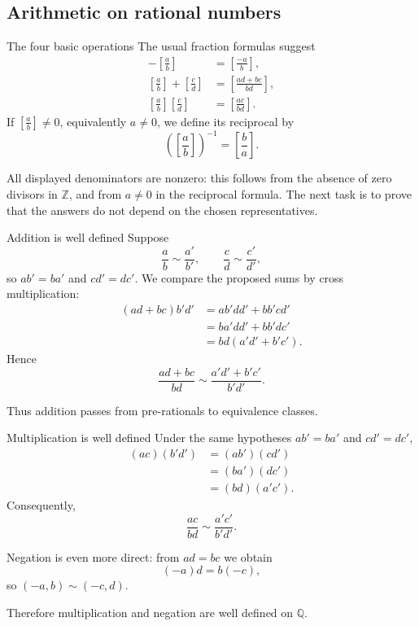 \documentclass[aspectratio=169,11pt]{beamer}
\newcommand{\Z}{\mathbb Z}
\newcommand{\Q}{\mathbb Q}
\newcommand{\qcl}[2]{\left[\frac{#1}{#2}\right]}
\begin{document}
\subsection{Arithmetic on rational numbers}

\begin{frame}{The four basic operations}
  The usual fraction formulas suggest
  \begin{align*}
    -\qcl ab&=\qcl{-a}b,\\
    \qcl ab+\qcl cd&=\qcl{ad+bc}{bd},\\
    \qcl ab\qcl cd&=\qcl{ac}{bd}.
  \end{align*}
  If \(\qcl ab\ne0\), equivalently \(a\ne0\), we define its reciprocal by
  \[
    \left(\qcl ab\right)^{-1}
      =\qcl ba.
  \]

  All displayed denominators are nonzero: this follows from the absence of
  zero divisors in \(\Z\), and from \(a\ne0\) in the reciprocal formula.  The
  next task is to prove that the answers do not depend on the chosen
  representatives.
\end{frame}

\begin{frame}{Addition is well defined}
  \footnotesize
  Suppose
  \[
    \frac ab\sim\frac{a'}{b'},
    \qquad
    \frac cd\sim\frac{c'}{d'},
  \]
  so \(ab'=ba'\) and \(cd'=dc'\).  We compare the proposed sums by cross
  multiplication:
  \begin{align*}
    (ad+bc)b'd'
      &=ab'dd'+bb'cd'\\
      &=ba'dd'+bb'dc'\\
      &=bd(a'd'+b'c').
  \end{align*}
  Hence
  \[
    \frac{ad+bc}{bd}\sim
    \frac{a'd'+b'c'}{b'd'}.
  \]

  Thus addition passes from pre-rationals to equivalence classes.
\end{frame}

\begin{frame}{Multiplication is well defined}
  \small
  Under the same hypotheses \(ab'=ba'\) and \(cd'=dc'\),
  \begin{align*}
    (ac)(b'd')
      &=(ab')(cd')\\
      &=(ba')(dc')\\
      &=(bd)(a'c').
  \end{align*}
  Consequently,
  \[
    \frac{ac}{bd}\sim\frac{a'c'}{b'd'}.
  \]

  Negation is even more direct: from \(ad=bc\) we obtain
  \[
    (-a)d=b(-c),
  \]
  so \((-a,b)\sim(-c,d)\).

  Therefore multiplication and negation are well defined on \(\Q\).
\end{frame}
\end{document}
